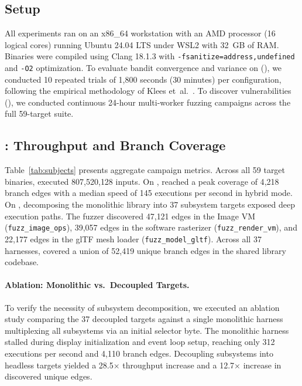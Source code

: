 \subsection{Setup}
All experiments ran on an x86\_64 workstation with an AMD processor (16 logical cores) running Ubuntu 24.04 LTS under WSL2 with 32~GB of RAM.
Binaries were compiled using Clang 18.1.3 with \texttt{-fsanitize=address,undefined} and \texttt{-O2} optimization.
To evaluate bandit convergence and variance on \fastgltf (), we conducted 10 repeated trials of 1{,}800 seconds (30 minutes) per configuration, following the empirical methodology of Klees et~al.~\cite{klees2018evaluating}.
To discover vulnerabilities (), we conducted continuous 24-hour multi-worker fuzzing campaigns across the full 59-target suite.

\subsection{: Throughput and Branch Coverage}
\label{sec:rq1}

Table~\ref{tab:subjects} presents aggregate campaign metrics.
Across all 59 target binaries, \tool executed 807{,}520{,}128 inputs.
On \fastgltf, \tool reached a peak coverage of 4{,}218 branch edges with a median speed of 145 executions per second in hybrid mode.
On \raylib, decomposing the monolithic library into 37 subsystem targets exposed deep execution paths.
The fuzzer discovered 47{,}121 edges in the Image VM (\texttt{fuzz\_image\_ops}), 39{,}057 edges in the software rasterizer (\texttt{fuzz\_render\_vm}), and 22{,}177 edges in the glTF mesh loader (\texttt{fuzz\_model\_gltf}).
Across all 37 harnesses, \tool covered a union of 52{,}419 unique branch edges in the shared \raylib library codebase.

\paragraph{Ablation: Monolithic vs.\ Decoupled Targets.}
To verify the necessity of subsystem decomposition, we executed an ablation study comparing the 37 decoupled targets against a single monolithic \raylib harness multiplexing all subsystems via an initial selector byte.
The monolithic harness stalled during display initialization and event loop setup, reaching only 312 executions per second and 4{,}110 branch edges.
Decoupling subsystems into headless targets yielded a 28.5$\times$ throughput increase and a 12.7$\times$ increase in discovered unique edges.

